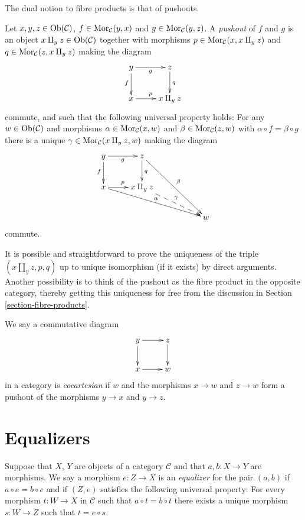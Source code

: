 \noindent
The dual notion to fibre products is that of pushouts.

\begin{definition}
\label{definition-pushouts}
Let $x, y, z\in \mathop{\mathrm{Ob}}\nolimits(\mathcal{C})$,
$f\in \mathop{\mathrm{Mor}}\nolimits_\mathcal{C}(y, x)$
and $g\in \mathop{\mathrm{Mor}}\nolimits_{\mathcal C}(y, z)$.
A {\it pushout} of $f$ and $g$ is
an object $x\amalg_y z\in \mathop{\mathrm{Ob}}\nolimits(\mathcal{C})$
together with morphisms
$p\in \mathop{\mathrm{Mor}}\nolimits_{\mathcal C}(x, x\amalg_y z)$ and
$q\in\mathop{\mathrm{Mor}}\nolimits_{\mathcal C}(z, x\amalg_y z)$ making the diagram
$$
\xymatrix{
y \ar[r]_g \ar[d]_f & z \ar[d]^q \\
x \ar[r]^p & x\amalg_y z
}
$$
commute, and such that the following universal property holds:
For any $w\in \mathop{\mathrm{Ob}}\nolimits(\mathcal{C})$ and morphisms
$\alpha \in \mathop{\mathrm{Mor}}\nolimits_{\mathcal C}(x, w)$ and
$\beta \in \mathop{\mathrm{Mor}}\nolimits_\mathcal{C}(z, w)$ with
$\alpha \circ f = \beta \circ g$ there is a unique
$\gamma\in \mathop{\mathrm{Mor}}\nolimits_{\mathcal C}(x\amalg_y z, w)$ making
the diagram
$$
\xymatrix{
y \ar[r]_g \ar[d]_f & z \ar[d]^q \ar[rrdd]^\beta & & \\
x \ar[r]^p \ar[rrrd]^\alpha & x \amalg_y z \ar@{-->}[rrd]^\gamma & & \\
& & & w
}
$$
commute.
\end{definition}

\noindent
It is possible and straightforward to prove the uniqueness of the triple
$(x\amalg_y z, p, q)$ up to unique isomorphism (if it exists) by direct
arguments. Another possibility is to think of the pushout as the
fibre product in the opposite category, thereby getting this uniqueness for
free from the discussion in Section \ref{section-fibre-products}.

\begin{definition}
\label{definition-cocartesian}
We say a commutative diagram
$$
\xymatrix{
y \ar[r] \ar[d] & z \ar[d] \\
x \ar[r] & w
}
$$
in a category is {\it cocartesian} if $w$ and the morphisms $x \to w$ and
$z \to w$ form a pushout of the morphisms $y \to x$ and $y \to z$.
\end{definition}


\section{Equalizers}
\label{section-equalizers}

\begin{definition}
\label{definition-equalizers}
Suppose that $X$, $Y$ are objects of a category $\mathcal{C}$
and that $a, b : X \to Y$ are morphisms. We say a morphism
$e : Z \to X$ is an {\it equalizer} for the pair $(a, b)$ if
$a \circ e = b \circ e$ and if $(Z, e)$ satisfies the following
universal property: For every morphism $t : W \to X$
in $\mathcal{C}$ such that $a \circ t = b \circ t$ there exists
a unique morphism $s : W \to Z$ such that $t = e \circ s$.
\end{definition}

